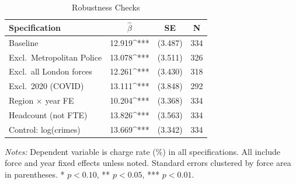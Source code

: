 \begin{table}[ht]
\centering
\caption{Robustness Checks}
\label{tab:robust}
\begin{tabular}{lccc}
\hline\hline
Specification & $\hat{\beta}$ & SE & N \\
\hline
Baseline & 12.919^{***} & (3.487) & 334 \\
Excl.\ Metropolitan Police & 13.078^{***} & (3.511) & 326 \\
Excl.\ all London forces & 12.261^{***} & (3.430) & 318 \\
Excl.\ 2020 (COVID) & 13.111^{***} & (3.848) & 292 \\
Region $\times$ year FE & 10.204^{***} & (3.368) & 334 \\
Headcount (not FTE) & 13.826^{***} & (3.563) & 334 \\
Control: log(crimes) & 13.669^{***} & (3.342) & 334 \\
\hline\hline
\end{tabular}
\begin{minipage}{0.92\textwidth}
\vspace{3pt}
\small\textit{Notes:} Dependent variable is charge rate (\%) in all specifications. All include force and year fixed effects unless noted. Standard errors clustered by force area in parentheses. * $p<0.10$, ** $p<0.05$, *** $p<0.01$.
\end{minipage}
\end{table}

